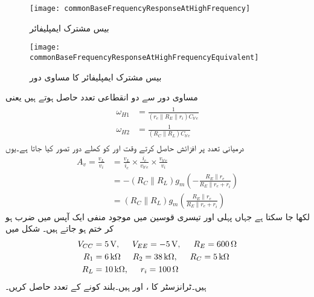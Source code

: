 \begin{figure}
\centering
\texttt{[image: commonBaseFrequencyResponseAtHighFrequency]}
\caption{بیس  مشترک ایمپلیفائر}
\label{شکل_تعددی_ردعمل_قابو_مشترک_ایمپلیفائر_بلند_تعدد_پر}
\end{figure}
%
\begin{figure}
\centering
\texttt{[image: commonBaseFrequencyResponseAtHighFrequencyEquivalent]}
\caption{بیس  مشترک ایمپلیفائر کا مساوی دور}
\label{شکل_تعددی_ردعمل_قابو_مشترک_ایمپلیفائر_بلند_تعدد_پر_مساوی}
\end{figure}

مساوی دور سے دو انقطاعی تعدد حاصل ہوتے ہیں یعنی 
%
\begin{gather}
\begin{aligned}\label{مساوات_تعددی_ردعمل_مشترک_قابو_بلند_کونے_کے_تعدد}
\omega_{H1}&=\frac{1}{\left(r_e \mathbin{\|} R_E \mathbin{\|} r_i \right) C_{b'e} }\\
\omega_{H2}&=\frac{1}{\left(R_C \mathbin{\|} R_L \right) C_{b'c}}
\end{aligned}
\end{gather}
درمیانی تعدد پر افزائش حاصل کرتے وقت  اور  کو کھلے دور تصور کیا جاتا ہے۔یوں
\begin{align*}
A_v=\frac{v_L}{v_i}&=\frac{v_L}{ i_c} \times \frac{i_c}{v_{b'e}} \times \frac{v_{b'e}}{v_i}\\
&=-\left(R_C \mathbin{\|} R_L\right) g_m \left(-\frac{R_E \mathbin{\|} r_e}{R_E \mathbin{\|} r_e+r_i} \right)\\
&=\left(R_C \mathbin{\|} R_L\right) g_m \left(\frac{R_E \mathbin{\|} r_e}{R_E \mathbin{\|} r_e+r_i} \right)
\end{align*}
لکھا جا سکتا ہے جہاں پہلی اور تیسری قوسین  میں موجود منفی ایک آپس میں ضرب ہو کر ختم ہو جاتے ہیں۔
شکل  میں
\begin{align*}
V_{CC}&=\SI{5}{\volt}, \hspace{5mm} V_{EE}=\SI{-5}{\volt}, \hspace{5mm} R_{E}=\SI{600}{\ohm}\\
R_1&=\SI{6}{\kilo \ohm} \hspace{5mm} R_2=\SI{38}{\kilo \ohm}, \hspace{5mm} R_C=\SI{5}{\kilo \ohm}\\
R_L&=\SI{10}{\kilo \ohm}, \hspace{5mm} r_i=\SI{100}{\ohm}
\end{align*}
ہیں۔ٹرانزسٹر کا ،  اور  ہیں۔بلند کونے کے تعدد حاصل کریں۔

